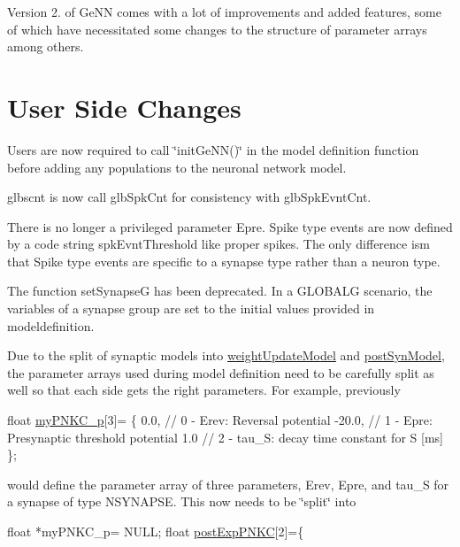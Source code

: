 Version 2. of Ge\+N\+N comes with a lot of improvements and added features, some of which have necessitated some changes to the structure of parameter arrays among others.\hypertarget{ReleaseNotes_UserChange}{}\section{User Side Changes}\label{ReleaseNotes_UserChange}

\begin{DoxyEnumerate}
\item Users are now required to call \char`\"{}init\+Ge\+N\+N()\char`\"{} in the model definition function before adding any populations to the neuronal network model.
\item glbscnt is now call glb\+Spk\+Cnt for consistency with glb\+Spk\+Evnt\+Cnt.
\item There is no longer a privileged parameter {\ttfamily Epre}. Spike type events are now defined by a code string {\ttfamily spk\+Evnt\+Threshold} like proper spikes. The only difference ism that Spike type events are specific to a synapse type rather than a neuron type.
\item The function set\+Synapse\+G has been deprecated. In a {\ttfamily G\+L\+O\+B\+A\+L\+G} scenario, the variables of a synapse group are set to the initial values provided in modeldefinition.
\item Due to the split of synaptic models into \hyperlink{classweightUpdateModel}{weight\+Update\+Model} and \hyperlink{structpostSynModel}{post\+Syn\+Model}, the parameter arrays used during model definition need to be carefully split as well so that each side gets the right parameters. For example, previously 
\begin{DoxyCode}
\textcolor{keywordtype}{float} \hyperlink{tmp_2model_2MBody__userdef_8cc_aae91814eee9533981fe819ddae4671c2}{myPNKC\_p}[3]= \{
  0.0,           \textcolor{comment}{// 0 - Erev: Reversal potential}
  -20.0,         \textcolor{comment}{// 1 - Epre: Presynaptic threshold potential}
  1.0            \textcolor{comment}{// 2 - tau\_S: decay time constant for S [ms]}
\};
\end{DoxyCode}
 would define the parameter array of three parameters, {\ttfamily Erev}, {\ttfamily Epre}, and {\ttfamily tau\+\_\+\+S} for a synapse of type {\ttfamily N\+S\+Y\+N\+A\+P\+S\+E}. This now needs to be \char`\"{}split\char`\"{} into 
\begin{DoxyCode}
\textcolor{keywordtype}{float} *myPNKC\_p= NULL;
\textcolor{keywordtype}{float} \hyperlink{tmp_2model_2MBody__userdef_8cc_a0186f2a893745a3325fb929335e73621}{postExpPNKC}[2]=\{

\end{DoxyCode}
\end{DoxyEnumerate}
